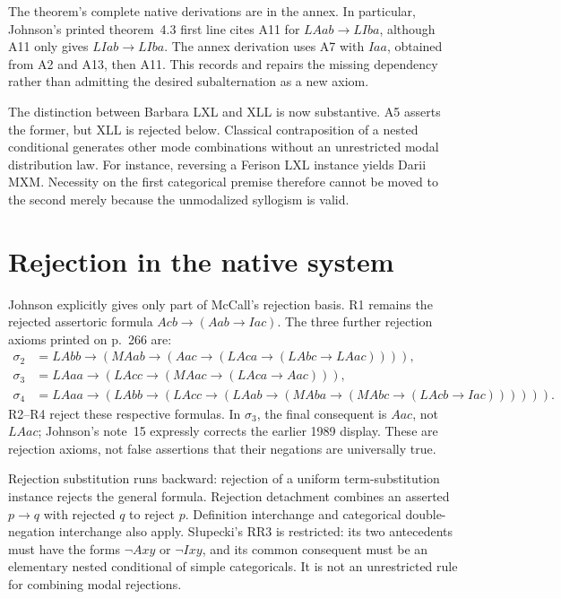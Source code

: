 The theorem's complete native derivations are in the annex. In particular,
Johnson's printed theorem~4.3 first line cites A11 for
\(LAab\to LIba\), although A11 only gives \(LIab\to LIba\).
The annex derivation uses A7 with \(Iaa\), obtained from A2 and A13,
then A11. This records and repairs the missing dependency rather than
admitting the desired subalternation as a new axiom.

The distinction between Barbara LXL and XLL is now substantive. A5 asserts
the former, but XLL is rejected below. Classical contraposition of a nested
conditional generates other mode combinations without an unrestricted modal
distribution law. For instance, reversing a Ferison LXL instance yields Darii
MXM. Necessity on the first categorical premise therefore cannot be moved
to the second merely because the unmodalized syllogism is valid.

\section{Rejection in the native system}
\label{sec:p13-johnson-mccall-rejection}

Johnson explicitly gives only part of McCall's rejection basis. R1 remains
the rejected assertoric formula \(Acb\to(Aab\to Iac)\).
The three further rejection axioms printed on p.~266 are:
\[
\begin{aligned}
\sigma_2&=LAbb\to(MAab\to(Aac\to(LAca\to(LAbc\to LAac)))),\\
\sigma_3&=LAaa\to(LAcc\to(MAac\to(LAca\to Aac))),\\
\sigma_4&=LAaa\to(LAbb\to(LAcc\to(LAab\to
 (MAba\to(MAbc\to(LAcb\to Iac)))))).
\end{aligned}
\]
R2--R4 reject these respective formulas. In \(\sigma_3\), the final
consequent is \(Aac\), not \(LAac\); Johnson's note~15 expressly corrects
the earlier 1989 display. These are rejection axioms, not false assertions
that their negations are universally true.

Rejection substitution runs backward: rejection of a uniform term-substitution
instance rejects the general formula. Rejection detachment combines an asserted
\(p\to q\) with rejected \(q\) to reject \(p\). Definition interchange and
categorical double-negation interchange also apply. S\l{}upecki's RR3 is
restricted: its two antecedents must have the forms \(\neg Axy\) or
\(\neg Ixy\), and its common consequent must be an elementary nested
conditional of simple categoricals. It is not an unrestricted rule for
combining modal rejections.

